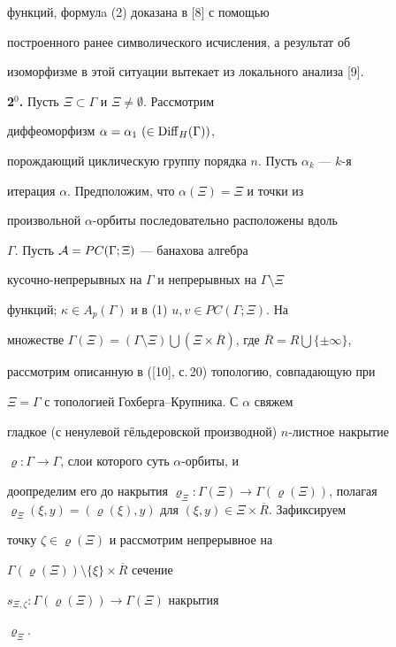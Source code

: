 функций, формулa (2) доказана в [8] с помощью


построенного ранее символического исчисления, а результат об


изоморфизме в этой ситуации вытекает из локального анализа [9].


\medskip





{\bf 2$^0$.} Пусть $\Xi\subset\Gamma$ и $\Xi\neq\emptyset$. Рассмотрим


диффеоморфизм $\alpha =\alpha_1\ (\in \operatorname{Diff}_H(\Gamma))$,


порождающий циклическую группу порядка $n$. Пусть $\alpha_k$ --- $k$-я


итерация $\alpha$. Предположим, что $\alpha (\Xi)=\Xi$ и точки из


произвольной $\alpha$-орбиты последовательно расположены вдоль


$\Gamma$. Пусть ${\cal A}=PC(\Gamma ;\Xi)$ --- банахова алгебра


кусочно-непрерывных на $\Gamma$ и непрерывных на $\Gamma\setminus\Xi$


функций; $\kappa\in A_p(\Gamma)$ и в (1) $u,v\in PC(\Gamma ;\Xi)$. На


множестве $\Gamma (\Xi )=(\Gamma\setminus\Xi )


\bigcup (\Xi\times\overline{R})$, где $\overline{R}=R\bigcup\{\pm\infty\}$,


рассмотрим описанную в ([10], с.\,20) топологию, совпадающую при


$\Xi=\Gamma$ с топологией Гохберга--Крупника. С $\alpha$ свяжем


гладкое (с ненулевой г\"ельдеровской производной) $n$-листное накрытие


$\varrho :\Gamma\to\Gamma$, слои которого суть $\alpha$-орбиты, и


доопределим его до накрытия $\varrho_\Xi :\Gamma (\Xi)


\to\Gamma (\varrho (\Xi))$, полагая $\varrho _\Xi (\xi,y)=


(\varrho (\xi ),y)$ для $(\xi,y)\in\Xi\times\overline{R}$. Зафиксируем


точку $\zeta\in\varrho (\Xi)$ и рассмотрим непрерывное на


$\Gamma (\varrho (\Xi))\setminus\{\xi\}\times\overline{R}$ сечение


$s_{\Xi,\zeta}:\Gamma (\varrho (\Xi))\to\Gamma (\Xi)$ накрытия


$\varrho_\Xi$.





